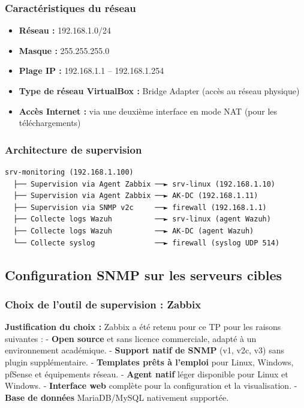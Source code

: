 \subsubsection{Caractéristiques du
réseau}\label{caractuxe9ristiques-du-ruxe9seau}

\begin{itemize}
\tightlist
\item
  \textbf{Réseau :} 192.168.1.0/24
\item
  \textbf{Masque :} 255.255.255.0
\item
  \textbf{Plage IP :} 192.168.1.1 -- 192.168.1.254
\item
  \textbf{Type de réseau VirtualBox :} Bridge Adapter (accès au réseau
  physique)
\item
  \textbf{Accès Internet :} via une deuxième interface en mode NAT (pour
  les téléchargements)
\end{itemize}

\subsubsection{Architecture de
supervision}\label{architecture-de-supervision}

\begin{verbatim}
srv-monitoring (192.168.1.100)
  ├── Supervision via Agent Zabbix ──► srv-linux (192.168.1.10)
  ├── Supervision via Agent Zabbix ──► AK-DC (192.168.1.11)
  ├── Supervision via SNMP v2c     ──► firewall (192.168.1.1)
  ├── Collecte logs Wazuh          ──► srv-linux (agent Wazuh)
  ├── Collecte logs Wazuh          ──► AK-DC (agent Wazuh)
  └── Collecte syslog              ──► firewall (syslog UDP 514)
\end{verbatim}

\subsection{Configuration SNMP sur les serveurs
cibles}\label{configuration-snmp-sur-les-serveurs-cibles}

\subsubsection{Choix de l'outil de supervision :
Zabbix}\label{choix-de-loutil-de-supervision-zabbix}

\textbf{Justification du choix :} Zabbix a été retenu pour ce TP pour
les raisons suivantes : - \textbf{Open source} et sans licence
commerciale, adapté à un environnement académique. - \textbf{Support
natif de SNMP} (v1, v2c, v3) sans plugin supplémentaire. -
\textbf{Templates prêts à l'emploi} pour Linux, Windows, pfSense et
équipements réseau. - \textbf{Agent natif} léger disponible pour Linux
et Windows. - \textbf{Interface web} complète pour la configuration et
la visualisation. - \textbf{Base de données} MariaDB/MySQL nativement
supportée.

